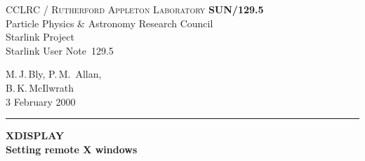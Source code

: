 \documentclass[twoside,11pt]{article}
\newcommand{\stardoccategory}  {Starlink User Note}
\newcommand{\stardocinitials}  {SUN}
\newcommand{\stardocnumber}    {129.5}
\newcommand{\stardocauthors}   {M.\,J.\,Bly, P.\,M.\, Allan, \\
                                B.\,K.\,McIlwrath}
\newcommand{\stardocdate}      {3 February 2000}
\newcommand{\stardoctitle}     {XDISPLAY \\[1.5ex] Setting remote X windows}
\newcommand{\stardocversion}   {Version 2.1}
\newcommand{\stardocname}{\stardocinitials /\stardocnumber}
\newenvironment{latexonly}{}{}
\renewcommand{\_}{\texttt{\symbol{95}}}
\begin{document}
\thispagestyle{empty}

\begin{latexonly}
   CCLRC / \textsc{Rutherford Appleton Laboratory} \hfill \textbf{\stardocname}\\
   {\large Particle Physics \& Astronomy Research Council}\\
   {\large Starlink Project\\}
   {\large \stardoccategory\ \stardocnumber}
   \begin{flushright}
   \stardocauthors\\
   \stardocdate
   \end{flushright}
   \vspace{-4mm}
   \rule{\textwidth}{0.5mm}
   \vspace{5mm}
   \begin{center}
   {\Huge\textbf{\stardoctitle \\ [2.5ex]}}
   \end{center}
   \vspace{5mm}


\end{latexonly}
\end{document}
